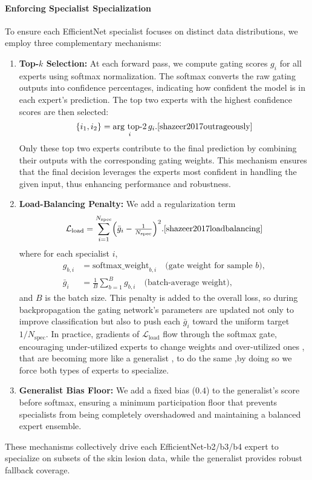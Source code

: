 \paragraph{Enforcing Specialist Specialization}
To ensure each EfficientNet specialist focuses on distinct data distributions, we employ three complementary mechanisms:
\begin{enumerate}
\item \textbf{Top-$k$ Selection:} At each forward pass, we compute gating scores $g_i$ for all experts using softmax normalization. The softmax converts the raw gating outputs into confidence percentages, indicating how confident the model is in each expert's prediction. The top two experts with the highest confidence scores are then selected:
\begin{equation*}
  \{i_1, i_2\} = \underset{i}{\text{arg top-2}}\, g_i. \cite{shazeer2017outrageously}
\end{equation*}
Only these top two experts contribute to the final prediction by combining their outputs with the corresponding gating weights. This mechanism ensures that the final decision leverages the experts most confident in handling the given input, thus enhancing performance and robustness.

\item \textbf{Load-Balancing Penalty:} We add a regularization term
  \begin{equation*}
    \mathcal{L}_{\text{load}} = \sum_{i=1}^{N_{\text{spec}}} \Bigl(\bar{g}_i - \tfrac{1}{N_{\text{spec}}}\Bigr)^2. \cite{shazeer2017loadbalancing}
  \end{equation*}
 where for each specialist $i$,
  \begin{align*}
    g_{b,i} &= \text{softmax\_weight}_{b,i}  \quad\text{(gate weight for sample $b$)},\\
    \bar{g}_i &= \frac{1}{B} \sum_{b=1}^{B} g_{b,i}  \quad\text{(batch-average weight)},
  \end{align*}
  and $B$ is the batch size. This penalty is added to the overall loss, so during backpropagation the gating network's parameters are updated not only to improve classification but also to push each $\bar{g}_i$ toward the uniform target $1/N_{\text{spec}}$. In practice, gradients of $\mathcal{L}_{\text{load}}$ flow through the softmax gate, encouraging under-utilized experts to change weights and over-utilized ones , that are becoming more like a generalist , to do the same ,by doing so we force both types of experts  to specialize.
\item \textbf{Generalist Bias Floor:} We add a fixed bias ($0.4$) to the generalist’s score before softmax, ensuring a minimum participation floor that prevents specialists from being completely overshadowed and maintaining a balanced expert ensemble.
\end{enumerate}
These mechanisms collectively drive each EfficientNet-b2/b3/b4 expert to specialize on subsets of the skin lesion data, while the generalist provides robust fallback coverage.

